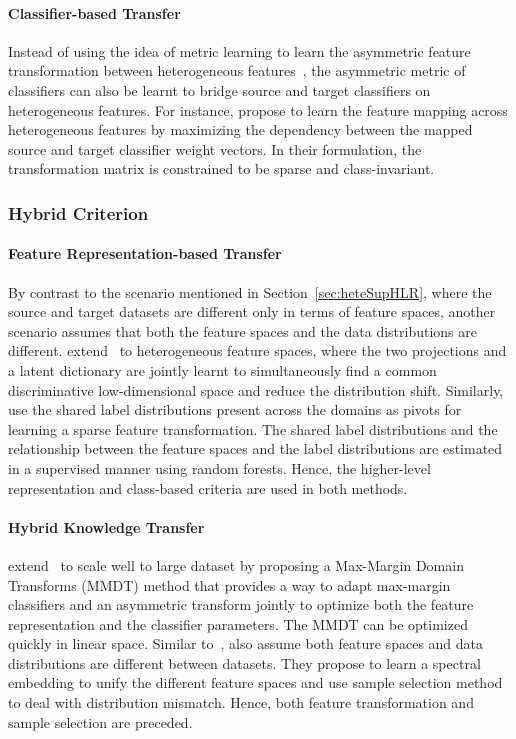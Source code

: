 \documentclass[prodmode]{acmsmall}  %
\begin{document}
\paragraph{Classifier-based Transfer} 
Instead of using the idea of metric learning to learn the asymmetric feature transformation between heterogeneous features~\cite{Kulis2011}, the asymmetric metric of classifiers can also be learnt to bridge source and target classifiers on heterogeneous features. 
For instance,  propose to learn the feature mapping across heterogeneous features by maximizing the dependency between the mapped source and target classifier weight vectors. In their formulation, the transformation matrix is constrained to be sparse and class-invariant.

\subsubsection{Hybrid Criterion}
\paragraph{Feature Representation-based Transfer} 
\label{sec:heteSupHyb}
By contrast to the scenario mentioned in Section~\ref{sec:heteSupHLR}, where the source and target datasets are different only in terms of feature spaces, another scenario assumes that both the feature spaces and the data distributions are different.  extend~\cite{Shekhar2013} to heterogeneous feature spaces, where the two projections and a latent dictionary are jointly learnt to simultaneously find a common discriminative low-dimensional space and reduce the distribution shift. Similarly,  use the shared label distributions present across the domains as pivots for learning a sparse feature transformation. The shared label distributions and the relationship between the feature spaces and the label distributions are estimated in a supervised manner using random forests. Hence, the higher-level representation and class-based criteria are used in both methods.
 
\paragraph{Hybrid Knowledge Transfer}
 extend~\cite{Kulis2011} to scale well to large dataset by proposing a Max-Margin Domain Transforms (MMDT) method that provides a way to adapt max-margin classifiers and an asymmetric transform jointly to optimize both the feature representation and the classifier parameters. The MMDT can be optimized quickly in linear space.
Similar to~\cite{Shekhar2015,Sukhija2016},  also assume both feature spaces and data distributions are different between datasets. They propose to learn a spectral embedding to unify the different feature spaces and use sample selection method to deal with distribution mismatch. Hence, both feature transformation and sample selection are preceded. 
\end{document}
